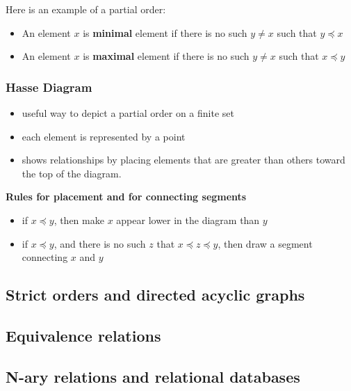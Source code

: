 Here is an example of a partial order:
\begin{center}
\end{center}
\begin{itemize}
  \item An element $x$ is \textbf{minimal} element if there is no such $y \not = x$ such that $y \preceq x$
  \item An element $x$ is \textbf{maximal} element if there is no such $y \not = x$ such that $x \preceq y$
\end{itemize}

\subsubsection*{Hasse Diagram}
\begin{itemize}
  \item useful way to depict a partial order on a finite set
  \item each element is represented by a point
  \item shows relationships by placing elements that are greater than others toward the top of the diagram.
\end{itemize}
\textbf{Rules for placement and for connecting segments}
\begin{itemize}
  \item if $x \preceq y$, then make $x$ appear lower in the diagram than $y$
  \item if $x \preceq y$, and there is no such $z$ that $x \preceq z \preceq y$, then draw a segment connecting $x$ and $y$
\end{itemize}

\subsection{Strict orders and directed acyclic graphs}
\subsection{Equivalence relations}
\subsection{N-ary relations and relational databases}